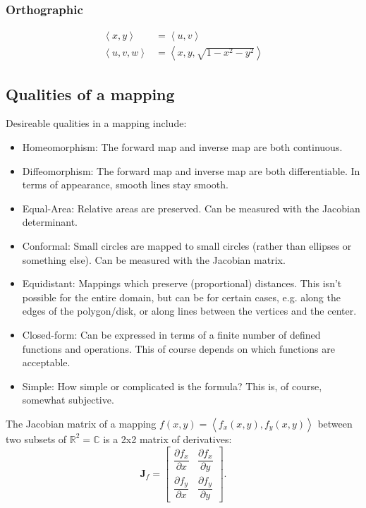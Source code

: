 \documentclass{amsart}[12pt]
\begin{document}
\subsubsection{Orthographic}
\begin{equation}\begin{split}
  \left<x, y\right> &= \left<u, v\right> \\
  \left<u, v, w\right> &= \left<x, y, \sqrt{1-x^2-y^2}\right>
\end{split}\end{equation}

\subsection{Qualities of a mapping}

Desireable qualities in a mapping include:
\begin{itemize}
\item Homeomorphism: The forward map and inverse map are both continuous.
\item Diffeomorphism: The forward map and inverse map are both differentiable.
In terms of appearance, smooth lines stay smooth.
\item Equal-Area: Relative areas are preserved.
  Can be measured with the Jacobian determinant.
\item Conformal: Small circles are mapped to small circles
(rather than ellipses or something else). Can be measured with the Jacobian matrix.
\item Equidistant: Mappings which preserve (proportional) distances. This isn't
possible for the entire domain, but can be for certain cases, e.g. along the
edges of the polygon/disk, or along lines between the vertices and the center.
\item Closed-form: Can be expressed in terms of a finite number of defined
functions and operations.
This of course depends on which functions are acceptable.
\item Simple: How simple or complicated is the formula? This is,
of course, somewhat subjective.
\end{itemize}

The Jacobian matrix of a mapping $f(x,y) = \left<f_x(x,y), f_y(x,y)\right>$
between two subsets of $\mathbb{R}^2 = \mathbb{C}$ is a 2x2 matrix of
derivatives:
\begin{equation}
\mathbf{J}_f =
\begin{bmatrix}
    \dfrac{\partial f_x}{\partial x} & \dfrac{\partial f_x}{\partial y}\\
    \dfrac{\partial f_y}{\partial x} & \dfrac{\partial f_y}{\partial y}
\end{bmatrix}.
\end{equation}
\end{document}
